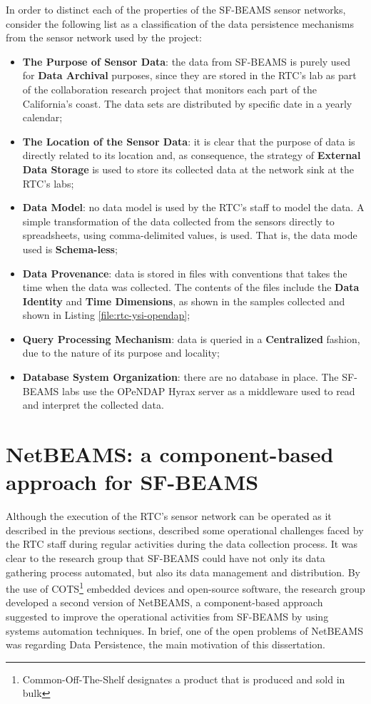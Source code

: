 In order to distinct each of the properties of the SF-BEAMS sensor
networks, consider the following list as a classification of the data
persistence mechanisms from the sensor network used by the project:

\begin{itemize}
  \item \textbf{The Purpose of Sensor Data}: the data from SF-BEAMS is purely
  used for \textbf{Data Archival} purposes, since they are stored in the RTC's
  lab as part of the collaboration research project that monitors each part of
  the California's coast. The data sets are distributed by specific date in a
  yearly calendar;
  \item \textbf{The Location of the Sensor Data}: it is clear that the purpose
  of data is directly related to its location and, as consequence, the strategy
  of \textbf{External Data Storage} is used to store its collected data at the
  network sink at the RTC's labs;
  \item \textbf{Data Model}: no data model is used by the RTC's staff to model
  the data. A simple transformation of the data collected from the sensors
  directly to spreadsheets, using comma-delimited values, is used. That is, the
  data mode used is \textbf{Schema-less};
  \item \textbf{Data Provenance}: data is stored in files with conventions that
  takes the time when the data was collected. The contents of the files include
  the \textbf{Data Identity} and \textbf{Time Dimensions}, as shown in
  the samples collected and shown in Listing \ref{file:rtc-ysi-opendap};
  \item \textbf{Query Processing Mechanism}: data is queried in a
  \textbf{Centralized} fashion, due to the nature of its purpose and locality;
  \item \textbf{Database System Organization}: there are no database in place.
  The SF-BEAMS labs use the OPeNDAP Hyrax server as a middleware used to read
  and interpret the collected data. 
\end{itemize}

\section{NetBEAMS: a component-based approach for SF-BEAMS}
\label{sec:problem-requirements}

Although the execution of the RTC's sensor network can be operated as it
described in the previous sections, \cite{netbeams2009} described some
operational challenges faced by the RTC staff during regular activities during
the data collection process. It was clear to the research group that SF-BEAMS
could have not only its data gathering process automated, but also its data
management and distribution. By the use of COTS\footnote{Common-Off-The-Shelf
designates a product that is produced and sold in bulk} embedded
devices and open-source \cite{open-source} software, the research group 
developed a second version of NetBEAMS, a component-based approach suggested
to improve the operational activities from SF-BEAMS by using systems
automation techniques. In brief, one of the open problems of NetBEAMS was
regarding Data Persistence, the main motivation of this dissertation.

